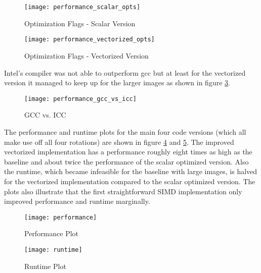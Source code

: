 \begin{figure}[H]
  \texttt{[image: performance\_scalar\_opts]}
  \caption{Optimization Flags - Scalar Version}
  \label{fig:perf_scal}
\end{figure}

\begin{figure}[H]
  \texttt{[image: performance\_vectorized\_opts]}
  \caption{Optimization Flags - Vectorized Version}
  \label{fig:perf_vec}
\end{figure}

Intel's compiler was not able to outperform gcc but at least for the vectorized
version it managed to keep up for the larger images as shown in figure
\ref{fig:perf_gcc_vs_icc}.

\begin{figure}[H]
  \texttt{[image: performance\_gcc\_vs\_icc]}
  \caption{GCC vs. ICC}
  \label{fig:perf_gcc_vs_icc}
\end{figure}

 The performance and runtime plots for the main four code
versions (which all make use off all four rotations) are shown in figure
\ref{fig:perf} and \ref{fig:runtime}. The improved vectorized implementation has
a performance roughly eight times as high as the baseline and about twice the
performance of the scalar optimized version. Also the runtime, which became
infeasible for the baseline with large images, is halved for the vectorized
implementation compared to the scalar optimized version. The plots also
illustrate that the first straightforward SIMD implementation only improved
performance and runtime marginally.

\begin{figure}[!ht]
  \texttt{[image: performance]}
  \caption{Performance Plot}
  \label{fig:perf}
\end{figure}


\begin{figure}[!ht]
  \texttt{[image: runtime]}
  \caption{Runtime Plot}
  \label{fig:runtime}
\end{figure}




